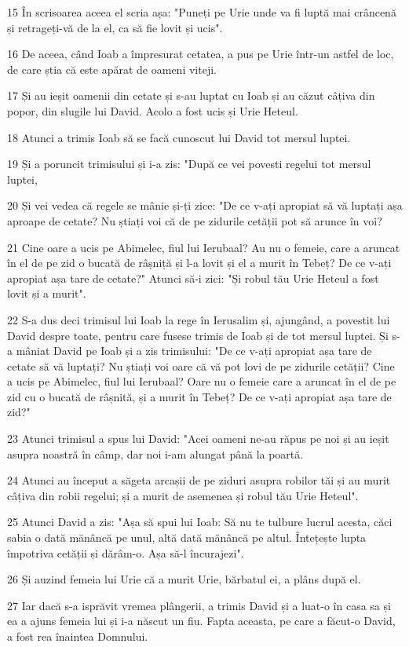 \par 15 În scrisoarea aceea el scria așa: "Puneți pe Urie unde va fi luptă mai crâncenă și retrageți-vă de la el, ca să fie lovit și ucis".
\par 16 De aceea, când Ioab a împresurat cetatea, a pus pe Urie într-un astfel de loc, de care știa că este apărat de oameni viteji.
\par 17 Și au ieșit oamenii din cetate și s-au luptat cu Ioab și au căzut câțiva din popor, din slugile lui David. Acolo a fost ucis și Urie Heteul.
\par 18 Atunci a trimis Ioab să se facă cunoscut lui David tot mersul luptei.
\par 19 Și a poruncit trimisului și i-a zis: "După ce vei povesti regelui tot mersul luptei,
\par 20 Și vei vedea că regele se mânie și-ți zice: "De ce v-ați apropiat să vă luptați așa aproape de cetate? Nu știați voi că de pe zidurile cetății pot să arunce în voi?
\par 21 Cine oare a ucis pe Abimelec, fiul lui Ierubaal? Au nu o femeie, care a aruncat în el de pe zid o bucată de râșniță și l-a lovit și el a murit în Tebeț? De ce v-ați apropiat așa tare de cetate?" Atunci să-i zici: "Și robul tău Urie Heteul a fost lovit și a murit".
\par 22 S-a dus deci trimisul lui Ioab la rege în Ierusalim și, ajungând, a povestit lui David despre toate, pentru care fusese trimis de Ioab și de tot mersul luptei. Și s-a mâniat David pe Ioab și a zis trimisului: "De ce v-ați apropiat așa tare de cetate să vă luptați? Nu știați voi oare că vă pot lovi de pe zidurile cetății? Cine a ucis pe Abimelec, fiul lui Ierubaal? Oare nu o femeie care a aruncat în el de pe zid cu o bucată de râșnită, și a murit în Tebeț? De ce v-ați apropiat așa tare de zid?"
\par 23 Atunci trimisul a spus lui David: "Acei oameni ne-au răpus pe noi și au ieșit asupra noastră în câmp, dar noi i-am alungat până la poartă.
\par 24 Atunci au început a săgeta arcașii de pe ziduri asupra robilor tăi și au murit câțiva din robii regelui; și a murit de asemenea și robul tău Urie Heteul".
\par 25 Atunci David a zis: "Așa să spui lui Ioab: Să nu te tulbure lucrul acesta, căci sabia o dată mănâncă pe unul, altă dată mănâncă pe altul. Întețește lupta împotriva cetății și dărâm-o. Așa să-l încurajezi".
\par 26 Și auzind femeia lui Urie că a murit Urie, bărbatul ei, a plâns după el.
\par 27 Iar dacă s-a isprăvit vremea plângerii, a trimis David și a luat-o în casa sa și ea a ajuns femeia lui și i-a născut un fiu. Fapta aceasta, pe care a făcut-o David, a fost rea înaintea Domnului.

